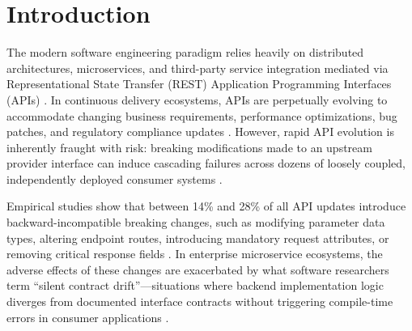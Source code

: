 \documentclass[conference]{IEEEtran}
\begin{document}
\section{Introduction}
\label{sec:introduction}
The modern software engineering paradigm relies heavily on distributed architectures, microservices, and third-party service integration mediated via Representational State Transfer (REST) Application Programming Interfaces (APIs) \cite{bogner2019microservices, dig2006apis}. In continuous delivery ecosystems, APIs are perpetually evolving to accommodate changing business requirements, performance optimizations, bug patches, and regulatory compliance updates \cite{linares2014api, brito2018web}. However, rapid API evolution is inherently fraught with risk: breaking modifications made to an upstream provider interface can induce cascading failures across dozens of loosely coupled, independently deployed consumer systems \cite{sohan2015case, li2013web}.

Empirical studies show that between 14\% and 28\% of all API updates introduce backward-incompatible breaking changes, such as modifying parameter data types, altering endpoint routes, introducing mandatory request attributes, or removing critical response fields \cite{brito2018web, decan2019empirical}. In enterprise microservice ecosystems, the adverse effects of these changes are exacerbated by what software researchers term ``silent contract drift''---situations where backend implementation logic diverges from documented interface contracts without triggering compile-time errors in consumer applications \cite{sundberg2023validating, chen2020holistic}.
\end{document}
